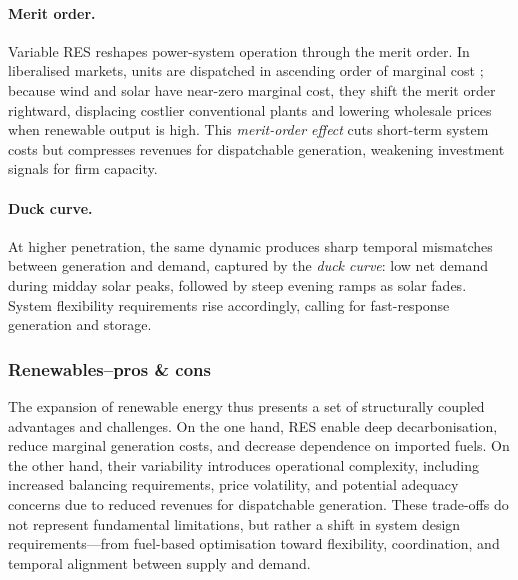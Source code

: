 \paragraph{Merit order.} 
Variable RES reshapes power-system operation through the merit order. In liberalised markets, units are dispatched in ascending order of marginal cost \cite{PowerExchangeMarkets}; because wind and solar have near-zero marginal cost, they shift the merit order rightward, displacing costlier conventional plants and lowering wholesale prices when renewable output is high. This \textit{merit-order effect} cuts short-term system costs but compresses revenues for dispatchable generation, weakening investment signals for firm capacity.

\paragraph{Duck curve.} 
At higher penetration, the same dynamic produces sharp temporal mismatches between generation and demand, captured by the \textit{duck curve}: low net demand during midday solar peaks, followed by steep evening ramps as solar fades. System flexibility requirements rise accordingly, calling for fast-response generation and storage.

\subsubsection*{Renewables--pros \& cons}
The expansion of renewable energy thus presents a set of structurally coupled advantages and challenges. On the one hand, RES enable deep decarbonisation, reduce marginal generation costs, and decrease dependence on imported fuels. On the other hand, their variability introduces operational complexity, including increased balancing requirements, price volatility, and potential adequacy concerns due to reduced revenues for dispatchable generation. These trade-offs do not represent fundamental limitations, but rather a shift in system design requirements—from fuel-based optimisation toward flexibility, coordination, and temporal alignment between supply and demand.

